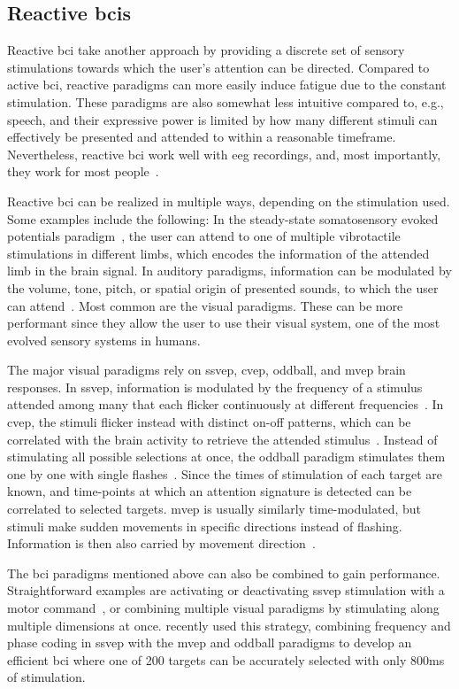 \subsection{Reactive \acsp{bci}}
Reactive \ac{bci} take another approach by providing a discrete set of sensory
stimulations towards which the user's attention can be directed.
Compared to active \ac{bci}, reactive paradigms can more easily induce fatigue due to
the constant stimulation.
These paradigms are also somewhat less intuitive compared to, e.g., speech, and their
expressive power is limited by how many different stimuli can effectively be presented
and attended to within a reasonable timeframe.
Nevertheless, reactive \ac{bci} work well with \ac{eeg} recordings, and, most
importantly, they work for most people~\cite{Allison2010a,Edlinger2014}.

Reactive \ac{bci} can be realized in multiple ways, depending on the stimulation used.
Some examples include the following:
In the steady-state somatosensory evoked potentials paradigm~\cite{Petit2021}, the user
can attend to one of multiple vibrotactile stimulations in different limbs, which
encodes the information of the attended limb in the brain signal.
In auditory paradigms, information can be modulated by the volume, tone, pitch, or
spatial origin of presented sounds, to which the user can attend~\cite{Kaongoen2017}.
Most common are the visual paradigms.
These can be more performant since they allow the user to use their visual system, one
of the most evolved sensory systems in humans.

The major visual paradigms rely on \ac{ssvep}, \ac{cvep}, oddball, and \ac{mvep} brain
responses.
In \ac{ssvep}, information is modulated by the frequency of a stimulus attended among
many that each flicker continuously at different frequencies~\cite{Chen2021}.
In \ac{cvep}, the stimuli flicker instead with distinct on-off patterns, which can be
correlated with the brain activity to retrieve the attended stimulus~\cite{Sun2022}.
Instead of stimulating all possible selections at once, the oddball paradigm stimulates
them one by one with single flashes~\cite{Pan2022}.
Since the times of stimulation of each target are known, and time-points at which an
attention signature is detected can be correlated to selected targets.
\Ac{mvep} is usually similarly time-modulated, but stimuli make sudden movements in
specific directions instead of flashing.
Information is then also carried by movement direction~\cite{Libert2021a,Libert2022}.

The \ac{bci} paradigms mentioned above can also be combined to gain performance.
Straightforward examples are activating or deactivating \ac{ssvep} stimulation with a
motor command~\cite{Neeling2019}, or combining multiple visual paradigms by stimulating
along multiple dimensions at once.
\textcite{Han2023} recently used this strategy, combining frequency and phase coding in
\ac{ssvep} with the \ac{mvep} and oddball paradigms to develop an efficient \ac{bci}
where one of 200 targets can be accurately selected with only 800ms of stimulation.

